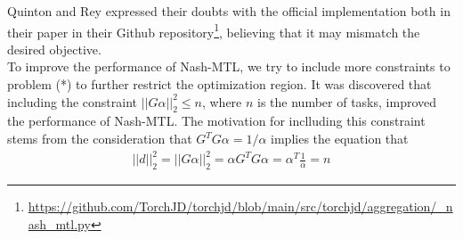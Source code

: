 \documentclass{article}
\newcommand{\R}{\mathbb{R}}
\renewcommand{\|}{\biggr|}
\begin{document}
    
    Quinton and Rey expressed their doubts with the official implementation both in their paper in their Github repository\footnote{\url{https://github.com/TorchJD/torchjd/blob/main/src/torchjd/aggregation/_nash_mtl.py}}, believing that it may mismatch the desired objective.
    \\
    To improve the performance of Nash-MTL, we try to include more constraints to problem (*) to further restrict the optimization region. It was discovered that including the constraint $||G\alpha||_2^2 \leq n$, where $n$ is the number of tasks, improved the performance of Nash-MTL. The motivation for inclluding this constraint stems from the consideration that $G^TG\alpha = 1/\alpha$ implies the equation that
    \begin{gather*}
        ||d||_2^2 = ||G\alpha||^2_2 = \alpha G^T G \alpha = \alpha^T \frac{1}{\alpha} = n
    \end{gather*}
\end{document}
